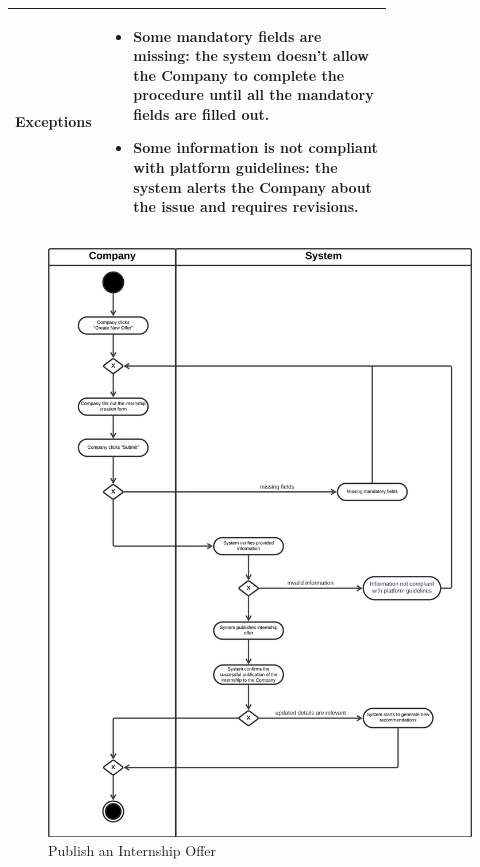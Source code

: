 \begin{center}
\begin{longtable}{|l|p{0.75\linewidth}|}
        \hline
        \textbf{Exceptions}       & \begin{itemize}
            \item Some mandatory fields are missing: the system doesn’t allow the Company to complete the procedure until all the mandatory fields are filled out.
            \item Some information is not compliant with platform guidelines: the system alerts the Company about the issue and requires revisions.
        \end{itemize} \\
        \hline
    \end{longtable}
\end{center}

\begin{figure}[H]
    \begin{center}
         \includegraphics[width=1\linewidth]{LaTeXCode/images/activity diagram/UC6.png}
         \caption{Publish an Internship Offer}
         \label{fig:publish_offer_ad}
     \end{center}
\end{figure}

